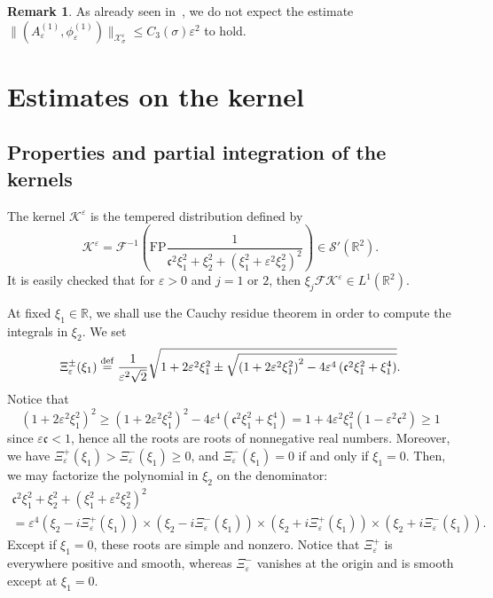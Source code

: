 \documentclass[10pt]{amsart}
\theoremstyle{definition}\newtheorem{defi}[theo]{Definition}\newtheorem{rema}[theo]{Remark}\newtheorem{exam}[theo]{Example}\newtheorem{exem}[theo]{Example}\newtheorem{nota}[theo]{Notation}
\newcommand*\R{\mathbb R}
\newcommand*\ddef{\stackrel{\rm def}{=}}
\newcommand{\FP}{\mathrm{FP}}
\newcommand*\BK{\mathcal{K}}
\newcommand*\BX{\mathcal{X}}
\newcommand*\Fou{\mathscr{F}}
\newcommand*\Sch{\mathscr{S}}
\newcommand*\cs{{\mathfrak c}}
\newcommand*\gs{\geqslant }
\newcommand*\ls{\leqslant }
\newcommand*\e{\varepsilon}
\newcommand*\s{\sigma}
\begin{document}
\begin{rema}
As already seen in~\cite{Cerror}, we do not expect the estimate $ \| (A^{(1)}_\e, \phi^{(1)}_\e) \|_{ \BX^\e_{\s} } \ls C_3 (\s) \e^2 $ to hold.
\end{rema}



\section{Estimates on the kernel}



\subsection{Properties and partial integration of the kernels}

The kernel $ \BK^\e $ is the tempered distribution defined by
\[
\BK^\e = \Fou^{-1} \left(
\FP \frac{1}{ \cs^2 \xi_1^2 + \xi_2^2 + \left(\xi_1^2 + \e^2 \xi_2^2\right)^2 } \right)
\in \Sch'(\R^2).
\]
It is easily checked that for $ \e > 0 $ and $ j =1 $ or $2$, then $ \xi_j \Fou \BK^\e \in L^1(\R^2) $.

At fixed $ \xi_1 \in \R $, we shall use the Cauchy residue theorem in order to compute the integrals in $ \xi_2 $. We set
\[
\Xi_\e^\pm (\xi_1) \ddef \frac{1}{\e^2 \sqrt{2} }
\sqrt{ 1+ 2\e^2 \xi_1^2
\pm \sqrt{\left(1+ 2\e^2 \xi_1^2\right)^2 - 4 \e^4 \left(\cs^2 \xi_1^2 + \xi_1^4\right) } }.
\]
Notice that
\[
\left(1+ 2\e^2 \xi_1^2\right)^2
\gs \left(1+ 2\e^2 \xi_1^2\right)^2 - 4 \e^4 \left(\cs^2 \xi_1^2 + \xi_1^4\right) = 1 + 4 \e^2 \xi_1^2 \left(1 - \e^2 \cs^2\right)
\gs 1
\]
since $ \e \cs < 1 $, hence all the roots are roots of nonnegative real numbers. Moreover, we have $ \Xi_\e^+ (\xi_1) > \Xi_\e^- (\xi_1) \gs 0 $, and $ \Xi_\e^- (\xi_1) = 0 $ if and only if $ \xi_1 = 0 $. Then, we may factorize the polynomial in $ \xi_2 $ on the denominator:
\begin{multline*}
\cs^2 \xi_1^2 + \xi_2^2 + \left(\xi_1^2 + \e^2 \xi_2^2\right)^2 \\
= \e^4 \left(\xi_2 - i \Xi_\e^+ (\xi_1)\right) \times \left(\xi_2 - i \Xi_\e^- (\xi_1)\right)
\times \left(\xi_2 + i \Xi_\e^+ (\xi_1)\right) \times \left(\xi_2 + i \Xi_\e^- (\xi_1)\right).
\end{multline*}
Except if $ \xi_1 = 0 $, these roots are simple and nonzero. Notice that $ \Xi_\e^+ $ is everywhere positive and smooth, whereas $ \Xi_\e^- $ vanishes at the origin and is smooth except at $ \xi_1 = 0 $.
\end{document}
